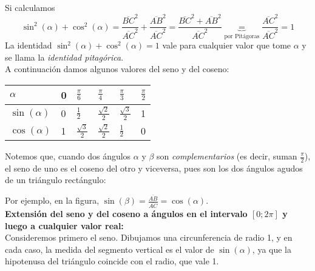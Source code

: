 \documentclass[../Teoría.root.tex]{subfiles}
\begin{document}
Si calculamos \[\sin^2(\alpha)+\cos^2(\alpha)=\frac{\overline{BC}^2}{\overline{AC}^2}+\frac{\overline{AB}^2}{\overline{AC}^2}=\frac{\overline{BC}^2+\overline{AB}^2}{\overline{AC}^2}\underbrace{=}_{\text{por Pitágoras}}\frac{\overline{AC}^2}{\overline{AC}^2}=1\]
La identidad \(\sin^2(\alpha) + \cos^2(\alpha) = 1\) vale para cualquier valor que tome \(\alpha\) y se llama la \textit{identidad pitagórica}.\\
A continuación damos algunos valores del seno y del coseno:
\begin{center}
    \begin{tabularx}{\textwidth}{|X|X|X|X|X|X|}
        \hline
        \(\alpha\)       & 0 & \(\frac{\pi}{6}\)      & \(\frac{\pi}{4}\)      & \(\frac{\pi}{3}\)      & \(\frac{\pi}{2}\) \\\hline
        \(\sin(\alpha)\) & 0 & \(\frac{1}{2}\)        & \(\frac{\sqrt{2}}{2}\) & \(\frac{\sqrt{3}}{2}\) & 1                 \\\hline
        \(\cos(\alpha)\) & 1 & \(\frac{\sqrt{3}}{2}\) & \(\frac{\sqrt{2}}{2}\) & \(\frac{1}{2}\)        & 0                 \\\hline
    \end{tabularx}
\end{center}
Notemos que, cuando dos ángulos \(\alpha\) y \(\beta\) son \textit{complementarios} (es decir, suman \(\frac{\pi}{2}\)), el seno de uno es el coseno del otro y viceversa, pues son los dos ángulos agudos de un triángulo rectángulo:
\begin{center}
\end{center}
Por ejemplo, en la figura, \(\sin(\beta)=\frac{\overline{AB}}{\overline{AC}}=\cos(\alpha)\).\\
\textbf{Extensión del seno y del coseno a ángulos en el intervalo \([0; 2\pi]\) y luego a cualquier valor real:}\\
Consideremos primero el seno.
Dibujamos una circunferencia de radio 1, y en cada caso, la medida del segmento vertical es el valor de \(\sin(\alpha)\), ya que la hipotenusa del triángulo coincide con el radio, que vale 1.
\end{document}
